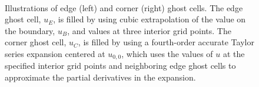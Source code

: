 \documentclass[fleqn,12pt,twoside]{article}
\begin{document}
\begin{figure}[tb]
\begin{center}
\ \ \ \ \ \ \ \ \ \ \ \ \ 
\caption{Illustrations of edge (left) and corner (right) ghost cells.
The edge ghost cell, $u_E$, is filled by using cubic extrapolation of 
the value on the boundary, $u_B$, and values at three interior grid points.  
The corner ghost cell, $u_C$, is filled by using a fourth-order accurate
Taylor series expansion centered at $u_{0,0}$, which uses the values of $u$ 
at the specified interior grid points and neighboring edge ghost cells to 
approximate the partial derivatives in the expansion. 
}
\label{fig:ghost_cells}
\end{center}
\end{figure}
\end{document}

